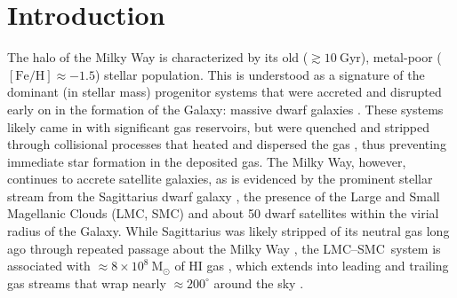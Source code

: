 \documentclass[modern]{aastex62}
\newcommand{\todo}[1]{{\color{red} TODO: #1}}
\newcommand{\msun}{\textrm{M}_\odot}
\newcommand{\kpc}{\textrm{kpc}}
\newcommand{\feh}{\ensuremath{[\textrm{Fe} / \textrm{H}]}}
\newcommand{\hi}{H{\footnotesize I} }
\newcommand{\clustername}{\textsl{Price-Whelan 1}}
\newcommand{\lmcsmc}{LMC--SMC}
\begin{document}
\begin{abstract}

We report the discovery of a young, $\lesssim 100~\textrm{Myr}$, metal-poor, $[\textrm{Fe}/\textrm{H}] \sim -1$, comoving stellar association in the halo of the Milky Way, $(R, z) \sim (24, 16)~\textrm{kpc}$.
The association --- \clustername\ --- is likely associated with the leading arm of the gas stream emanating from the Magellanic cloud system, but is located $\approx 60^\circ$ from the Large Magellanic Cloud (LMC) center, on the other side of the Milky Way disk relative to the LMC.
By assuming that the cluster is co-located with \hi gas in the stream, we directly measure the distance to the Magellanic stream, $d \approx 25~\textrm{kpc}$.
At this location relative to the LMC, the measured distance is inconsistent with predictions from models of the LMC/SMC interaction and infall into the Milky Way \todo{that don't account for ram pressure and gas interaction with MW disk}
The estimated age of \clustername\ is consistent with the time of last passage through the Galactic midplane.
We therefore conclude that this star-formation event was triggered by the last disk passage, which occurred at a Galactocentric radius $R \approx XX~\kpc$.
\todo{Further follow-up needed...spectroscopy}
\end{abstract}



\section{Introduction} \label{sec:intro}

The halo of the Milky Way is characterized by its old ($\gtrsim 10~\textrm{Gyr}$), metal-poor ($\feh \approx -1.5$) stellar population.
This is understood as a signature of the dominant (in stellar mass) progenitor systems that were accreted and disrupted early on in the formation of the Galaxy: massive dwarf galaxies \citep[e.g.,][]{Deason:2015, Fiorentino:2015}.
These systems likely came in with significant gas reservoirs, but were quenched and stripped through collisional processes that heated and dispersed the gas \citep[e.g.,][]{Mayer:2006}, thus preventing immediate star formation in the deposited gas.
The Milky Way, however, continues to accrete satellite galaxies, as is evidenced by the prominent stellar stream from the Sagittarius dwarf galaxy \citep{Ibata:1994, Majewski:2003}, the presence of the Large and Small Magellanic Clouds (LMC, SMC) and about 50 dwarf satellites within the virial radius of the Galaxy.
While Sagittarius was likely stripped of its neutral gas long ago through repeated passage about the Milky Way \citep{Burton:1999, Tepper-Garcia:2018}, the \lmcsmc\ system is associated with $\approx 8\times 10^8~\msun$ of \hi gas \citep{Bruns:2005}, which extends into leading and trailing gas streams that wrap nearly $\approx 200^\circ$ around the sky \citep{Mathewson:1974, Putman:1998, Bruns:2005, Nidever:2010}.
\end{document}
